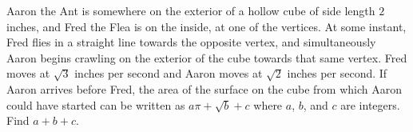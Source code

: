 Aaron the Ant is somewhere on the exterior of a hollow cube of side length $2$ inches, and Fred the Flea is on the inside, at one of the vertices. At some instant, Fred flies in a straight line towards the opposite vertex, and simultaneously Aaron begins crawling on the exterior of the cube towards that same vertex. Fred moves at $\sqrt{3}$ inches per second and Aaron moves at $\sqrt{2}$ inches per second. If Aaron arrives before Fred, the area of the surface on the cube from which Aaron could have started can be written as $a\pi+\sqrt{b}+c$ where $a$,  $b$,  and $c$ are integers. Find $a+b+c.$